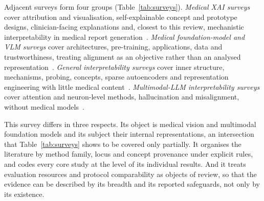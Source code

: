Adjacent surveys form four groups (Table~\ref{tab:surveys}). \emph{Medical XAI surveys} cover attribution
and visualisation, self-explainable concept and prototype designs, clinician-facing explanations and, closest
to this review, mechanistic interpretability in medical report
generation~\cite{tjoa2019survey,vandervelden2021explainable,salahuddin2021transparency,shrestha2023medical,hou2024self,sun2024explainable,imran2026multimodal,muhammad2025cracking}.
\emph{Medical foundation-model and VLM surveys} cover architectures, pre-training, applications, data and
trustworthiness, treating alignment as an objective rather than an analysed
representation~\cite{zhang2023challenges,azad2023foundational,khan2024comprehensive,ye2025multimodal}.
\emph{General interpretability surveys} cover inner structure, mechanisms, probing, concepts, sparse
autoencoders and representation engineering with little medical
content~\cite{rauker2022toward,bereska2024mechanistic,belinkov2021probing,poeta2023concept,shu2025a,wehner2025taxonomy,knab2026whats}.
\emph{Multimodal-LLM interpretability surveys} cover attention and neuron-level methods, hallucination and
misalignment, without medical
models~\cite{lin2025survey,dang2024explainable,shu2025large,bai2024hallucination,zhang2026locate}.

This survey differs in three respects. Its object is medical vision and multimodal foundation models and
its subject their internal representations, an intersection that Table~\ref{tab:surveys} shows to be
covered only partially. It organises the literature by method family, locus and concept provenance under
explicit rules, and codes every core study at the level of its individual results. And it treats
evaluation resources and protocol comparability as objects of review, so that the evidence can be
described by its breadth and its reported safeguards, not only by its existence.

